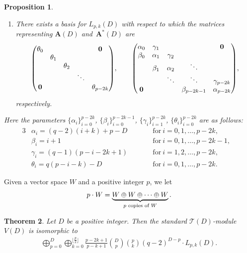 \documentclass[pdftex]{sigma}%
\def\A{\mathbf A}
\def\T{\mathcal T}
\numberwithin{equation}{section}
\newtheorem{Theorem}{Theorem}[section]
\newtheorem{Proposition}[Theorem]{Proposition}
 { \theoremstyle{definition}
\newtheorem{Definition}[Theorem]{Definition}
\newtheorem{Note}[Theorem]{Note}
\newtheorem{Example}[Theorem]{Example}
\newtheorem{Remark}[Theorem]{Remark} }
\begin{document}
\begin{Proposition}
\begin{enumerate}
\item[$(ii)$] There exists a basis for $L_{p,k}(D)$ with respect to which the matrices representing $\A(D)$ and~$\A^*(D)$ are
\begin{gather*}
\begin{pmatrix}
\theta_0 & & & &{\bf 0}
\\
 &\theta_1
\\
 & &\theta_2
 \\
 & & &\ddots
 \\
{\bf 0} & & & &\theta_{p-2k}
\end{pmatrix}\!,
\qquad
\begin{pmatrix}
\alpha_0 &\gamma_1 & & &{\bf 0}
\\
\beta_0 &\alpha_1 &\gamma_2
\\
&\beta_1 &\alpha_2 &\ddots
 \\
& &\ddots &\ddots &\gamma_{p-2k}
 \\
{\bf 0} & & &\beta_{p-2k-1} &\alpha_{p-2k}
\end{pmatrix}\!,
\end{gather*}
respectively.
\end{enumerate}
Here the parameters $\{\alpha_i\}_{i=0}^{p-2k}$,
$\{\beta_i\}_{i=0}^{p-2k-1}$, $\{\gamma_i\}_{i=1}^{p-2k}$, $\{\theta_i\}_{i=0}^{p-2k}$ are as follows:
\begin{alignat*}{3}
&\alpha_i=(q-2)(i+k)+p-D\qquad
&&\text{for}\ i=0,1,\dots,p-2k,&
\\
&\beta_i=i+1\qquad
&&\text{for}\ i=0,1,\dots,p-2k-1,&
\\
&\gamma_i=(q-1)(p-i-2k+1)\qquad
&&\text{for}\ i=1,2,\dots,p-2k,&
\\
&\theta_i=q(p-i-k)-D\qquad
&&\text{for} \ i=0,1,\dots,p-2k.&
\end{alignat*}
\end{Proposition}

Given a vector space $W$ and a positive integer $p$, we let
\[
p\cdot W=\underbrace{W\oplus W\oplus \cdots \oplus W}_
{\text{{\scriptsize $p$ copies of $W$}}}.
\]

\begin{Theorem}\label{thm:dec_T(D)module}
Let $D$ be a positive integer. Then the standard $\T(D)$-module $V(D)$ is isomorphic to
\begin{gather*}
\bigoplus_{p=0}^D\bigoplus_{k=0}^{\lfloor \frac{p}{2}\rfloor}
\frac{p-2k+1}{p-k+1}{D\choose p}{p\choose k}(q-2)^{D-p}\cdot L_{p,k}(D).
\end{gather*}
\end{Theorem}
\end{document}
